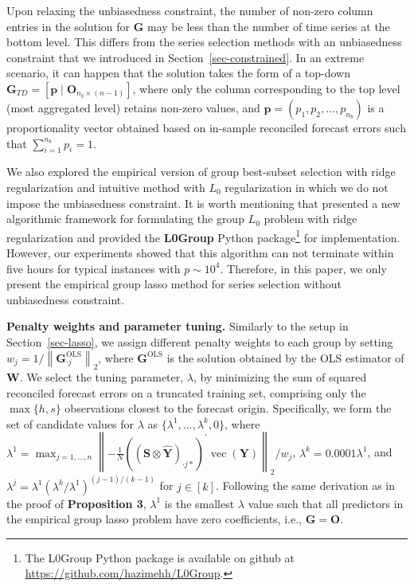 \documentclass[11pt,a4paper,]{article}
\begin{document}
Upon relaxing the unbiasedness constraint, the number of non-zero column
entries in the solution for \(\boldsymbol{G}\) may be less than the
number of time series at the bottom level. This differs from the series
selection methods with an unbiasedness constraint that we introduced in
Section~\ref{sec-constrained}. In an extreme scenario, it can happen
that the solution takes the form of a top-down
\(\boldsymbol{G}_{TD}=[\boldsymbol{p} \mid \boldsymbol{O}_{n_b \times (n-1)}]\),
where only the column corresponding to the top level (most aggregated
level) retains non-zero values, and
\(\boldsymbol{p} = (p_1, p_2, \ldots, p_{n_b})\) is a proportionality
vector obtained based on in-sample reconciled forecast errors such that
\(\sum_{i=1}^{n_b} p_i=1\).

We also explored the empirical version of group best-subset selection
with ridge regularization and intuitive method with \(L_0\)
regularization in which we do not impose the unbiasedness constraint. It
is worth mentioning that \textcite{Hazimeh2023-ie} presented a new
algorithmic framework for formulating the group \(L_0\) problem with
ridge regularization and provided the \textbf{L0Group} Python
package\footnote{The L0Group Python package is available on github at
  \url{https://github.com/hazimehh/L0Group}.} for implementation.
However, our experiments showed that this algorithm can not terminate
within five hours for typical instances with \(p \sim 10^4\). Therefore,
in this paper, we only present the empirical group lasso method for
series selection without unbiasedness constraint.

\textbf{Penalty weights and parameter tuning.} Similarly to the setup in
Section~\ref{sec-lasso}, we assign different penalty weights to each
group by setting
\(w_j = 1/\left\|\boldsymbol{G}_{\cdot j}^{\text{OLS}}\right\|_2\),
where \(\boldsymbol{G}^{\text{OLS}}\) is the solution obtained by the
OLS estimator of \(\boldsymbol{W}\). We select the tuning parameter,
\(\lambda\), by minimizing the sum of squared reconciled forecast errors
on a truncated training set, comprising only the \(\max\{h, s\}\)
observations closest to the forecast origin. Specifically, we form the
set of candidate values for \(\lambda\) as
\(\{\lambda^{1},...,\lambda^{k}, 0\}\), where
\(\lambda^{1} = \max _{j=1, \ldots, n}\left\|-\frac{1}{N}\left(\left(\boldsymbol{S} \otimes \hat{\boldsymbol{Y}}\right)_{\cdot j*}\right)^{\prime} \operatorname{vec}(\boldsymbol{Y})\right\|_2 / w_j\),
\(\lambda^{k} = 0.0001\lambda^{1}\), and
\(\lambda^{j} = \lambda^{1}\left(\lambda^{k} / \lambda^{1}\right)^{(j-1) / (k-1)}\)
for \(j \in [k]\). Following the same derivation as in the proof of
\textbf{Proposition 3}, \(\lambda^{1}\) is the smallest \(\lambda\)
value such that all predictors in the empirical group lasso problem have
zero coefficients, i.e., \(\boldsymbol{G} = \boldsymbol{O}\).
\end{document}
